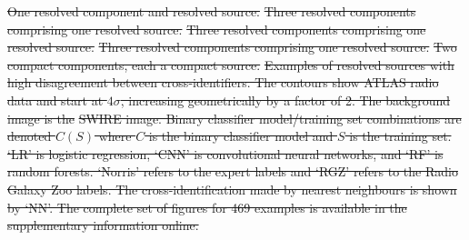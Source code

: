 \documentclass[11pt, a4paper]{book}
\providecommand{\DIFdeltex}[1]{{\protect\color{red}\sout{#1}}}                      %
\providecommand{\DIFdelFL}[1]{\DIFdel{#1}} %
\providecommand{\DIFdel}[1]{\texorpdfstring{\DIFdeltex{#1}}{}} %
\begin{document}
{%
\DIFdelFL{One resolved component and resolved source.}}
{%
\DIFdelFL{Three resolved components comprising one resolved source.}}
{%
\DIFdelFL{Three resolved components comprising one resolved source.}}
{%
\DIFdelFL{Three resolved components comprising one resolved source.}}
{%
\DIFdelFL{Two compact components, each a compact source.}}
{%
\DIFdelFL{Examples of resolved sources with high disagreement between cross-identifiers. The contours show ATLAS radio data and start at $4\sigma$, increasing geometrically by a factor of 2. The background image is the }%
\DIFdelFL{SWIRE image. Binary classifier model/training set combinations are denoted $C(S)$ where $C$ is the binary classifier model and $S$ is the training set. `LR' is logistic regression, `CNN' is convolutional neural networks, and `RF' is random forests. `Norris' refers to the expert labels and `RGZ' refers to the Radio Galaxy Zoo labels. The cross-identification made by nearest neighbours is shown by `NN'. The complete set of figures for 469 examples is available in the supplementary information online.}}
\end{document}
